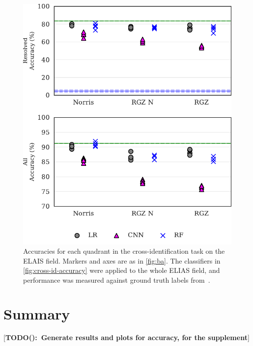 \documentclass[fleqn,usenatbib,usedcolumn]{mnras}
\newcommand{\matthew}[2]{ {\color{white!20!violet}[{\bf TODO(#1):~{#2}}]} }
\begin{document}
\begin{figure}[htbp]
  \centering
  \includegraphics[width=\columnwidth]{images/elais_cross_identification_grid.pdf}
  \caption{Accuracies for each quadrant in the cross-identification
    task on the ELAIS field. Markers and axes are as in \autoref{fig:ba}.
    The classifiers in \autoref{fig:cross-id-accuracy}
    were applied to the whole ELIAS field, and performance was measured against
    ground truth labels from~\citet{middelberg08}.
    \label{fig:elais-cross-id-accuracy}}
\end{figure}


\section{Summary}


\matthew{}{Generate results and plots for accuracy, for the supplement}


%





\bsp	%
\label{lastpage}
\end{document}

